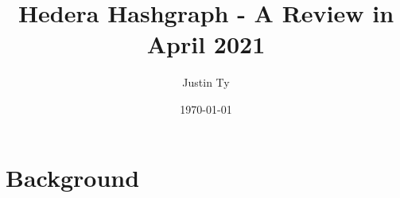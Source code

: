 \documentclass{article}
\begin{document}

\author{Justin Ty}
\title{Hedera Hashgraph - A Review in April 2021 }
\date{\today}

\maketitle


\section{Background}
\cite{einstein}
\printbibliography

\end{document}
